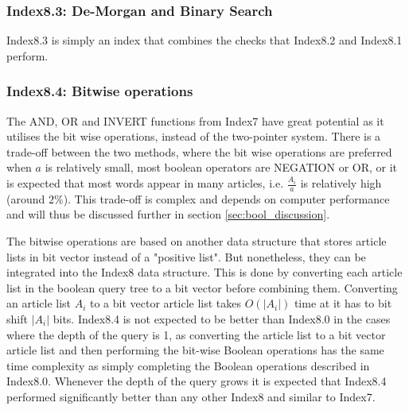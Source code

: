 \subsubsection{Index8.3: De-Morgan and Binary Search}
Index8.3 is simply an index that combines the checks that Index8.2 and Index8.1 perform. 

\subsubsection{Index8.4: Bitwise operations}
The AND, OR and INVERT functions from Index7 have great potential as it utilises the bit wise operations, instead of the two-pointer system. There is a trade-off between the two methods, where the bit wise operations are preferred when $a$ is relatively small, most boolean operators are NEGATION or OR, or it is expected that most words appear in many articles, i.e. $\frac{A_i}{a}$ is relatively high (around $2\%$). This trade-off is complex and depends on computer performance and will thus be discussed further in section \ref{sec:bool_discussion}. 

The bitwise operations are based on another data structure that stores article lists in bit vector instead of a "positive list". But nonetheless, they can be integrated into the Index8 data structure. This is done by converting each article list in the boolean query tree to a bit vector before combining them. Converting an article list $A_i$ to a bit vector article list takes $O(|A_i|)$ time at it has to bit shift $|A_i|$ bits. Index8.4 is not expected to be better than Index8.0 in the cases where the depth of the query is 1, as converting the article list to a bit vector article list and then performing the bit-wise Boolean operations has the same time complexity as simply completing the Boolean operations described in Index8.0. Whenever the depth of the query grows it is expected that Index8.4 performed significantly better than any other Index8 and similar to Index7.

